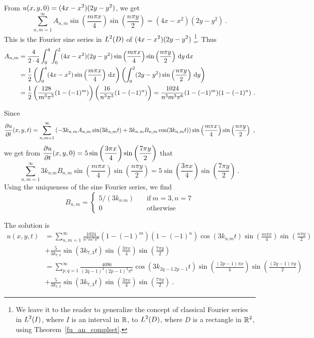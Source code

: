 \begin{egg}
From $\displaystyle u(x,y,0) = (4x-x^2)(2y-y^2)$, we get
\[
\sum_{n,m=1}^\infty A_{n,m}\sin\left(\frac{m\pi x}{4}\right)
\sin\left(\frac{n\pi y}{2}\right) = (4x-x^2)(2y-y^2) \ .
\]
This is the Fourier sine series in $\displaystyle L^2(D)$ of
$\displaystyle (4x-x^2)(2y-y^2)$
\footnote{We leave it to the reader to generalize the concept of
classical Fourier series in $\displaystyle L^2(I)$, where $I$ is an interval in
$\mathbb{R}$, to $\displaystyle L^2(D)$, where $D$ is a rectangle in
$\displaystyle \mathbb{R}^2$, using Theorem~\ref{fu_an_complset}.}.  Thus
\begin{align*}
A_{n,m} &= \frac{4}{2\cdot 4} \int_0^4 \int_0^2 (4x-x^2)(2y-y^2)
\sin\left(\frac{m\pi x}{4}\right)
\sin\left(\frac{n\pi y}{2}\right) \,\mathrm{d}{y}\,\mathrm{d}{x} \\
&= \frac{1}{2}
\left(\int_0^4 (4x-x^2) \sin\left(\frac{m\pi x}{4}\right) \,\mathrm{d}{x} \right)
\left( \int_0^2 (2y-y^2)\sin\left(\frac{n\pi y}{2}\right) \,\mathrm{d}{y} \right) \\
&= \frac{1}{2}\left( \frac{128}{m^3\pi^3}(1-(-1)^m)\right)
\left(\frac{16}{n^3\pi^3} (1-(-1)^n)\right)
= \frac{1024}{n^3 m^3 \pi^6} (1-(-1)^m)(1-(-1)^n) \ .
\end{align*}

Since
\[
\frac{\partial{u}}{\partial t}(x,y,t) = \sum_{n,m=1}^\infty
\left(-3 k_{n.m}A_{n,m} \sin(3 k_{n,m} t) + 3 k_{n.m} B_{n,m}
\cos(3 k_{n,m} t)\right)\sin\left(\frac{m\pi x}{4}\right)
\sin\left(\frac{n\pi y}{2}\right) \ ,
\]
we get from $\displaystyle
\frac{\partial{u}}{\partial t}(x,y,0) = 5\sin\left(\frac{3\pi x}{4}\right)
\sin\left(\frac{7\pi y}{2}\right)$ that
\[
\sum_{n,m=1}^\infty 3 k_{n.m} B_{n,m}\sin\left(\frac{m\pi x}{4}\right)
\sin\left(\frac{n\pi y}{2}\right) = 5\sin\left(\frac{3\pi x}{4}\right)
\sin\left(\frac{7\pi y}{2}\right) \ .
\]
Using the uniqueness of the sine Fourier series, we find
\[
B_{n,m} = \begin{cases}
5/(3k_{n.m}) & \quad \text{if}\ m=3,n=7 \\
0 & \quad \text{otherwise}
\end{cases}
\]

The solution is
\begin{align*}
u(x,y,t) &= \sum_{n,m=1}^\infty \frac{1024}{n^3 m^3 \pi^6} (1-(-1)^m)(1-(-1)^n)
\cos(3 k_{n.m} t)\sin\left(\frac{m\pi x}{4}\right)
\sin\left(\frac{n\pi y}{2}\right) \\
&+ \frac{5}{3k_{7,3}} \sin (3k_{7,3} t)
\sin\left(\frac{3\pi x}{4}\right)
\sin\left(\frac{7\pi y}{2}\right) \\
&= \sum_{p,q=1}^\infty \frac{4096}{(2q-1)^3 (2p-1)^3 \pi^6}
\cos(3 k_{2q-1.2p-1} t)\sin\left(\frac{(2p-1)\pi x}{4}\right)
\sin\left(\frac{(2q-1)\pi y}{2}\right) \\
&+ \frac{5}{3k_{7,3}} \sin (3k_{7,3} t)
\sin\left(\frac{3\pi x}{4}\right)
\sin\left(\frac{7\pi y}{2}\right) \ .
\end{align*}
\end{egg}

